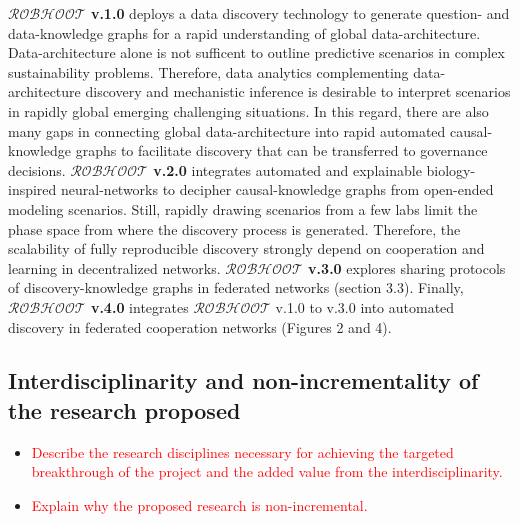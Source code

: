 \documentclass[11pt, a4paper]{article} %
\begin{document}
{\bf $\mathcal{ROBHOOT}$ v.1.0} deploys a data discovery technology to
generate question- and data-knowledge graphs for a rapid understanding
of global data-architecture. Data-architecture alone is not sufficent
to outline predictive scenarios in complex sustainability
problems. Therefore, data analytics complementing data-architecture
discovery and mechanistic inference is desirable to interpret
scenarios in rapidly global emerging challenging situations. In this
regard, there are also many gaps in connecting global
data-architecture into rapid automated causal-knowledge graphs to
facilitate discovery that can be transferred to governance
decisions. {\bf $\mathcal{ROBHOOT}$ v.2.0} integrates automated and
explainable biology-inspired neural-networks to decipher
causal-knowledge graphs from open-ended modeling scenarios. Still,
rapidly drawing scenarios from a few labs limit the phase space from
where the discovery process is generated. Therefore, the scalability
of fully reproducible discovery strongly depend on cooperation and
learning in decentralized networks. {\bf $\mathcal{ROBHOOT}$ v.3.0}
explores sharing protocols of discovery-knowledge graphs in federated
networks (section 3.3). Finally, {\bf $\mathcal{ROBHOOT}$ v.4.0}
integrates $\mathcal{ROBHOOT}$ v.1.0 to v.3.0 into automated discovery
in federated cooperation networks (Figures 2 and 4).

\subsection{Interdisciplinarity and non-incrementality of the research
  proposed}

\begin{itemize}
\item \textcolor{red}{Describe the research disciplines necessary for
    achieving the targeted breakthrough of the project and the added
    value from the interdisciplinarity.}
\item \textcolor{red}{Explain why the proposed research is
    non-incremental.}
  \end{itemize}
\end{document}
